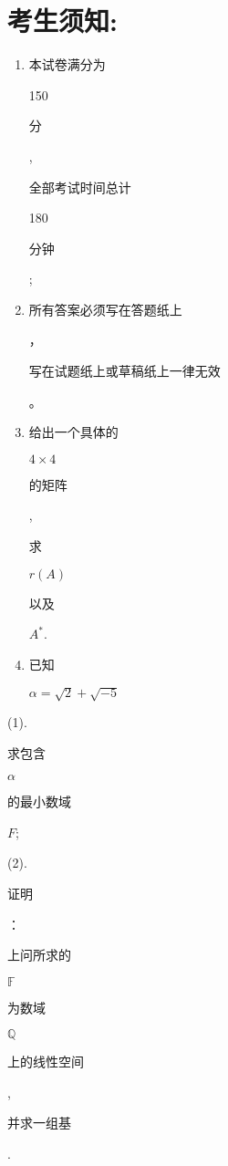 \documentclass[10pt]{article}
\begin{document}
\section{考生须知:}
\begin{enumerate}
  \item \begin{CJK}{UTF8}{mj}本试卷满分为\end{CJK} 150 \begin{CJK}{UTF8}{mj}分\end{CJK}, \begin{CJK}{UTF8}{mj}全部考试时间总计\end{CJK} 180 \begin{CJK}{UTF8}{mj}分钟\end{CJK};

  \item \begin{CJK}{UTF8}{mj}所有答案必须写在答题纸上\end{CJK}，\begin{CJK}{UTF8}{mj}写在试题纸上或草稿纸上一律无效\end{CJK}。

  \item \begin{CJK}{UTF8}{mj}给出一个具体的\end{CJK} $4 \times 4$ \begin{CJK}{UTF8}{mj}的矩阵\end{CJK}, \begin{CJK}{UTF8}{mj}求\end{CJK} $r(A)$ \begin{CJK}{UTF8}{mj}以及\end{CJK} $A^{*}$.

  \item \begin{CJK}{UTF8}{mj}已知\end{CJK} $\alpha=\sqrt{2}+\sqrt{-5}$

\end{enumerate}
(1). \begin{CJK}{UTF8}{mj}求包含\end{CJK} $\alpha$ \begin{CJK}{UTF8}{mj}的最小数域\end{CJK} $F$;

(2). \begin{CJK}{UTF8}{mj}证明\end{CJK}：\begin{CJK}{UTF8}{mj}上问所求的\end{CJK} $\mathbb{F}$ \begin{CJK}{UTF8}{mj}为数域\end{CJK} $\mathbb{Q}$ \begin{CJK}{UTF8}{mj}上的线性空间\end{CJK}, \begin{CJK}{UTF8}{mj}并求一组基\end{CJK}.
\end{document}

